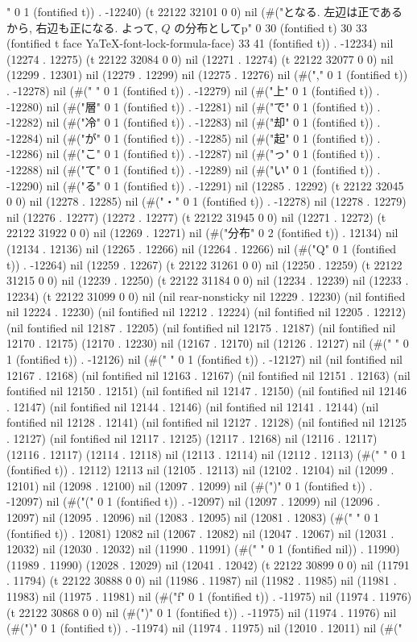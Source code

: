 " 0 1 (fontified t)) . -12240) (t 22122 32101 0 0) nil (#("となる. 左辺は正であるから, 右辺も正になる. よって, $Q$ の分布としてp" 0 30 (fontified t) 30 33 (fontified t face YaTeX-font-lock-formula-face) 33 41 (fontified t)) . -12234) nil (12274 . 12275) (t 22122 32084 0 0) nil (12271 . 12274) (t 22122 32077 0 0) nil (12299 . 12301) nil (12279 . 12299) nil (12275 . 12276) nil (#("," 0 1 (fontified t)) . -12278) nil (#(" " 0 1 (fontified t)) . -12279) nil (#("上" 0 1 (fontified t)) . -12280) nil (#("層" 0 1 (fontified t)) . -12281) nil (#("で" 0 1 (fontified t)) . -12282) nil (#("冷" 0 1 (fontified t)) . -12283) nil (#("却" 0 1 (fontified t)) . -12284) nil (#("が" 0 1 (fontified t)) . -12285) nil (#("起" 0 1 (fontified t)) . -12286) nil (#("こ" 0 1 (fontified t)) . -12287) nil (#("っ" 0 1 (fontified t)) . -12288) nil (#("て" 0 1 (fontified t)) . -12289) nil (#("い" 0 1 (fontified t)) . -12290) nil (#("る" 0 1 (fontified t)) . -12291) nil (12285 . 12292) (t 22122 32045 0 0) nil (12278 . 12285) nil (#("・" 0 1 (fontified t)) . -12278) nil (12278 . 12279) nil (12276 . 12277) (12272 . 12277) (t 22122 31945 0 0) nil (12271 . 12272) (t 22122 31922 0 0) nil (12269 . 12271) nil (#("分布" 0 2 (fontified t)) . 12134) nil (12134 . 12136) nil (12265 . 12266) nil (12264 . 12266) nil (#("Q" 0 1 (fontified t)) . -12264) nil (12259 . 12267) (t 22122 31261 0 0) nil (12250 . 12259) (t 22122 31215 0 0) nil (12239 . 12250) (t 22122 31184 0 0) nil (12234 . 12239) nil (12233 . 12234) (t 22122 31099 0 0) nil (nil rear-nonsticky nil 12229 . 12230) (nil fontified nil 12224 . 12230) (nil fontified nil 12212 . 12224) (nil fontified nil 12205 . 12212) (nil fontified nil 12187 . 12205) (nil fontified nil 12175 . 12187) (nil fontified nil 12170 . 12175) (12170 . 12230) nil (12167 . 12170) nil (12126 . 12127) nil (#("
" 0 1 (fontified t)) . -12126) nil (#(" " 0 1 (fontified t)) . -12127) nil (nil fontified nil 12167 . 12168) (nil fontified nil 12163 . 12167) (nil fontified nil 12151 . 12163) (nil fontified nil 12150 . 12151) (nil fontified nil 12147 . 12150) (nil fontified nil 12146 . 12147) (nil fontified nil 12144 . 12146) (nil fontified nil 12141 . 12144) (nil fontified nil 12128 . 12141) (nil fontified nil 12127 . 12128) (nil fontified nil 12125 . 12127) (nil fontified nil 12117 . 12125) (12117 . 12168) nil (12116 . 12117) (12116 . 12117) (12114 . 12118) nil (12113 . 12114) nil (12112 . 12113) (#(" " 0 1 (fontified t)) . 12112) 12113 nil (12105 . 12113) nil (12102 . 12104) nil (12099 . 12101) nil (12098 . 12100) nil (12097 . 12099) nil (#(")" 0 1 (fontified t)) . -12097) nil (#("(" 0 1 (fontified t)) . -12097) nil (12097 . 12099) nil (12096 . 12097) nil (12095 . 12096) nil (12083 . 12095) nil (12081 . 12083) (#(" " 0 1 (fontified t)) . 12081) 12082 nil (12067 . 12082) nil (12047 . 12067) nil (12031 . 12032) nil (12030 . 12032) nil (11990 . 11991) (#(" " 0 1 (fontified nil)) . 11990) (11989 . 11990) (12028 . 12029) nil (12041 . 12042) (t 22122 30899 0 0) nil (11791 . 11794) (t 22122 30888 0 0) nil (11986 . 11987) nil (11982 . 11985) nil (11981 . 11983) nil (11975 . 11981) nil (#("f" 0 1 (fontified t)) . -11975) nil (11974 . 11976) (t 22122 30868 0 0) nil (#(")" 0 1 (fontified t)) . -11975) nil (11974 . 11976) nil (#(")" 0 1 (fontified t)) . -11974) nil (11974 . 11975) nil (12010 . 12011) nil (#("
